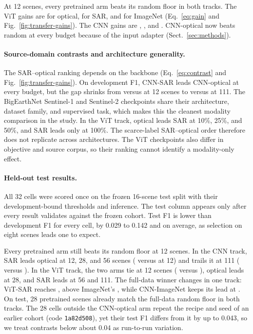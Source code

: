 At 12 scenes, every pretrained arm beats its random floor in both tracks.
The ViT gains are \HevDeltaFTenViTOptical{} for optical,
\HevDeltaFTenViTSar{} for SAR, and \HevDeltaFTenViTImageNet{} for ImageNet
(Eq.~\eqref{eq:gain} and Fig.~\ref{fig:transfer-gains}). The CNN gains are
\HevDeltaFTenCNNOptical{}, \HevDeltaFTenCNNSar{}, and
\HevDeltaFTenCNNImageNet. CNN-optical now beats random at every budget
because of the input adapter (Sect.~\ref{sec:methods}).

\paragraph{Source-domain contrasts and architecture generality.}

The SAR--optical ranking depends on the backbone
(Eq.~\eqref{eq:contrast} and Fig.~\ref{fig:transfer-gains}). On
development F1, CNN-SAR leads CNN-optical at every budget, but the gap
shrinks from \HevDevFCNNSarTen{} versus \HevDevFCNNOpticalTen{} at 12 scenes
to \HevDevFCNNSarHundred{} versus \HevDevFCNNOpticalHundred{} at 111. The
BigEarthNet Sentinel-1 and Sentinel-2 checkpoints share their architecture,
dataset family, and supervised task, which makes this the cleanest modality
comparison in the study. In the ViT track, optical leads SAR at 10\%, 25\%,
and 50\%, and SAR leads only at 100\%. The scarce-label SAR--optical order
therefore does not replicate across architectures. The ViT checkpoints also
differ in objective and source corpus, so their ranking cannot identify a
modality-only effect.

\paragraph{Held-out test results.}

\ifHevTestComplete
All 32 cells were scored once on the frozen 16-scene test split with their
development-bound thresholds and \HevTestInferencePrecision{} inference.
The test column appears only after every result validates against the frozen
cohort. Test F1 is lower than development F1 for every cell, by 0.029 to
0.142 and \HevTestMeanGap{} on average, as selection on eight scenes leads
one to expect.

Every pretrained arm still beats its random floor at 12 scenes. In the CNN
track, SAR leads optical at 12, 28, and 56 scenes (\HevTestFCNNSarTen{}
versus \HevTestFCNNOpticalTen{} at 12) and trails it at 111
(\HevTestFCNNSarHundred{} versus \HevTestFCNNOpticalHundred). In the ViT
track, the two arms tie at 12 scenes (\HevTestFViTSarTen{} versus
\HevTestFViTOpticalTen), optical leads at 28, and SAR leads at 56 and 111.
The full-data winner changes in one track: ViT-SAR reaches
\HevTestFViTSarHundred, above ImageNet's \HevTestFViTImageNetHundred, while
CNN-ImageNet keeps its lead at \HevTestFCNNImageNetHundred. On test, 28
pretrained scenes already match the full-data random floor in both tracks.
The 28 cells outside the CNN-optical arm repeat the recipe and seed of an
earlier cohort (code \texttt{1a82d508}), yet their test F1 differs from it
by up to 0.043, so we treat contrasts below about 0.04 as run-to-run
variation.

